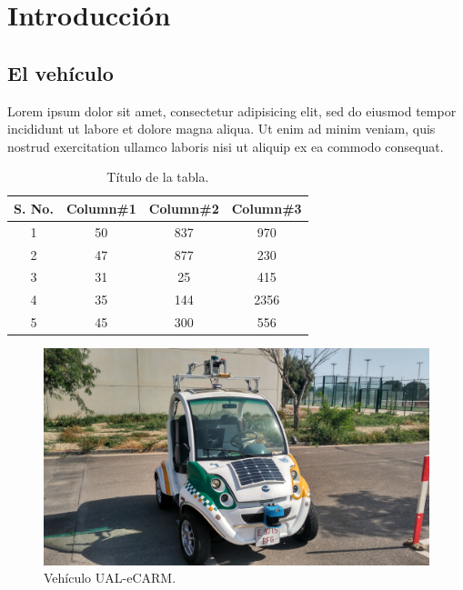\chapter{Introducción}
\section{El vehículo}
Lorem ipsum dolor sit amet, consectetur adipisicing elit, sed do eiusmod tempor incididunt ut labore et dolore magna aliqua. Ut enim ad minim veniam, quis nostrud exercitation ullamco laboris nisi ut aliquip ex ea commodo consequat.

\begin{table}[H]
\caption{Título de la tabla.}
\centering
\begin{tabular}{|c |c |c |c|}
\hline\hline
S. No. & Column\#1 & Column\#2 & Column\#3 \\ [0.5ex]
\hline %
1 & 50 & 837 & 970 \\
2 & 47 & 877 & 230 \\
3 & 31 & 25 & 415 \\
4 & 35 & 144 & 2356 \\
5 & 45 & 300 & 556 \\
\hline
\end{tabular}
\label{Tab:Ejemplo}
\end{table}

\begin{figure}
  \centering
    \includegraphics[width=1\textwidth]{Figuras/vehiculo-aparcamientos.jpg}
  \caption{Vehículo UAL-eCARM.}
  \label{fig:vehiculo}
\end{figure}
